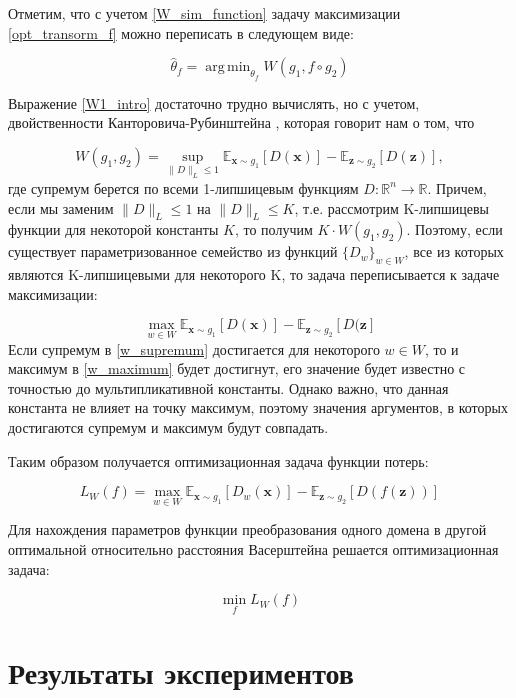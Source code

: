 \documentclass[12pt]{extarticle}
\DeclareMathOperator*{\argmin}{arg\,min}
\newcommand{\bfx}{\mathbf{x}}
\newcommand{\bfz}{\mathbf{z}}
\newcommand{\bbr}{\mathbb{R}}
\newcommand{\expectation}{\mathbb{E}}
\begin{document}
Отметим, что с учетом \eqref{W_sim_function} задачу максимизации \eqref{opt_transorm_f} можно переписать в следующем виде:

$$\hat{\theta}_f = \argmin_{\theta_f} W ( g_1,  f\circ g_2)$$


Выражение \eqref{W1_intro} достаточно трудно вычислять, но с учетом, двойственности Канторовича-Рубинштейна \cite{Kantorovich_Rubinstein_duality}, которая говорит нам о том, что

\begin{equation}
    \label{w_supremum}
    W(g_1, g_2) = \sup_{\|D\|_L\leq 1} \expectation_{\bfx\sim g_1}[D(\bfx)] - \expectation_{\bfz\sim g_2}[D(\bfz)],
\end{equation}
где супремум берется по всеми 1-липшицевым функциям  $D : \bbr^n \to \bbr$. Причем, если мы заменим $\|D\|_L \leq 1$ на $\|D\|_L \leq K$, т.е. рассмотрим K-липшицевы функции для некоторой константы $K$, то получим $K \cdot W(g_1, g_2)$. Поэтому, если существует параметризованное семейство из функций $\{D_w\}_{w\in W}$, все из которых являются K-липшицевыми для некоторого K, то задача переписывается к задаче максимизации:

\begin{equation}
    \label{w_maximum}\max_{w \in W} \expectation_{\bfx\sim g_1}[D(\bfx)] - \expectation_{\bfz\sim g_2}[D(\bfz]
\end{equation}
Если супремум в \eqref{w_supremum} достигается для некоторого $w \in W$, то и максимум в \eqref{w_maximum} будет достигнут, его значение будет известно с точностью до мультипликативной константы. Однако важно, что данная константа не влияет на точку максимум, поэтому значения аргументов, в которых достигаются супремум и максимум будут совпадать.

Таким образом получается оптимизационная задача функции потерь:

$$L_W(f) = \max_{w \in W} \expectation_{\bfx\sim g_1}[D_w(\bfx)] - \expectation_{\bfz\sim g_2}[D(f(\bfz))]$$

Для нахождения параметров функции преобразования одного домена в другой оптимальной относительно расстояния Васерштейна решается оптимизационная задача:

\begin{equation}
    \label{minmax_for_W}
    \min_f L_{W}(f)
\end{equation}

\newpage
\section{Результаты экспериментов}
\end{document}
